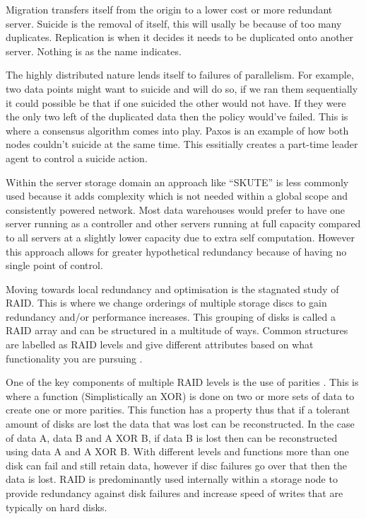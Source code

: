 \documentclass{UoYCSproject}
\begin{document}
Migration transfers itself from the origin to a lower cost or more redundant server.
Suicide is the removal of itself, this will usally be because of too many duplicates.
Replication is when it decides it needs to be duplicated onto another server.
Nothing is as the name indicates.

The highly distributed nature lends itself to failures of parallelism. 
For example, two data points might want to suicide and will do so, if we ran them sequentially it could possible be that if one suicided the other would not have. 
If they were the only two left of the duplicated data then the policy would’ve failed.
This is where a consensus algorithm comes into play.
Paxos \cite{Paxos} is an example of how both nodes couldn’t suicide at the same time. 
This essitially creates a part-time leader agent to control a suicide action.

Within the server storage  domain an approach like “SKUTE” is less commonly used because it adds complexity which is not needed within a global scope and consistently powered network.
Most data warehouses would prefer to have one server running as a controller and other servers running at full capacity compared to all servers at a slightly lower capacity due to extra self computation.
However this approach allows for greater hypothetical redundancy because of having no single point of control.

Moving towards local redundancy and optimisation is the stagnated study of RAID.
This is where we change orderings of multiple storage discs to gain redundancy and/or performance increases.
This grouping of disks is called a RAID array and can be structured in a multitude of ways.
Common structures are labelled as RAID levels and give different attributes based on what functionality you are pursuing \cite{RAID levels}.

One of the key components of multiple RAID levels is the use of parities \cite{Raid parity}.
This is where a function (Simplistically an XOR) is done on two or more sets of data to create one or more parities.
This function has a property thus that if a tolerant amount of disks are lost the data that was lost can be reconstructed.
In the case of data A, data B and A XOR B, if data B is lost then can be reconstructed using data A and A XOR B.
With different levels and functions more than one disk can fail and still retain data, however if disc failures go over that then the data is lost.
RAID is predominantly used internally within a storage node to provide redundancy against disk failures and increase speed of writes that are typically on hard disks.
\end{document}
